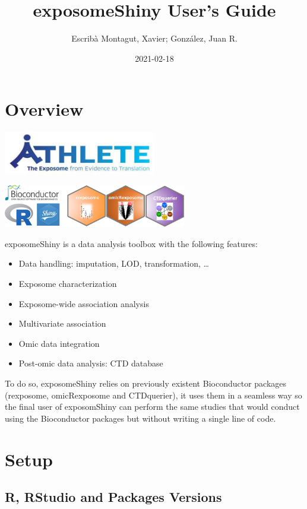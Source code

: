 \documentclass[
]{book}
\title{exposomeShiny User's Guide}
\author{Escribà Montagut, Xavier; González, Juan R.}
\date{2021-02-18}
\providecommand{\tightlist}{%
  \setlength{\itemsep}{0pt}\setlength{\parskip}{0pt}}
\begin{document}
\maketitle

{
\setcounter{tocdepth}{1}
\tableofcontents
}
\hypertarget{overview}{%
\chapter{Overview}\label{overview}}

\includegraphics[width=0.5\textwidth,height=\textheight]{images/athlete.png}

\includegraphics[width=0.6\textwidth,height=\textheight]{images/logo.png}

exposomeShiny is a data analysis toolbox with the following features:

\begin{itemize}
\tightlist
\item
  Data handling: imputation, LOD, transformation, \ldots{}
\item
  Exposome characterization
\item
  Exposome-wide association analysis
\item
  Multivariate association
\item
  Omic data integration
\item
  Post-omic data analysis: CTD database
\end{itemize}

To do so, exposomeShiny relies on previously existent Bioconductor packages (rexposome, omicRexposome and CTDquerier), it uses them in a seamless way so the final user of exposomShiny can perform the same studies that would conduct using the Bioconductor packages but without writing a single line of code.

\hypertarget{setup}{%
\chapter{Setup}\label{setup}}

\hypertarget{r-rstudio-and-packages-versions}{%
\section{R, RStudio and Packages Versions}\label{r-rstudio-and-packages-versions}}
\end{document}
